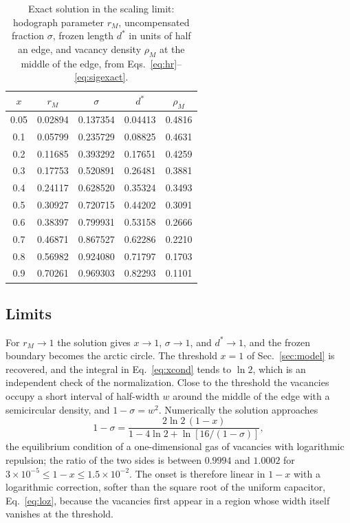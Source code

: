 \documentclass[reprint,aps,pre,superscriptaddress,longbibliography,floatfix,amsmath,amssymb]{revtex4-2}
\newcommand{\sig}{\sigma}                %
\newcommand{\dst}{d^{*}}                 %
\newcommand{\rM}{r_{M}}
\begin{document}
\begin{table}[b]
\caption{Exact solution in the scaling limit: hodograph parameter $\rM$, uncompensated fraction $\sig$, frozen length $\dst$ in units of half an edge, and vacancy density $\rho_M$ at the middle of the edge, from Eqs.~\eqref{eq:hr}--\eqref{eq:sigexact}.}
\label{tab:sol}
\begin{ruledtabular}
\begin{tabular}{ccccc}
$x$ & $\rM$ & $\sig$ & $\dst$ & $\rho_M$\\ \hline
0.05 & 0.02894 & 0.137354 & 0.04413 & 0.4816\\
0.1 & 0.05799 & 0.235729 & 0.08825 & 0.4631\\
0.2 & 0.11685 & 0.393292 & 0.17651 & 0.4259\\
0.3 & 0.17753 & 0.520891 & 0.26481 & 0.3881\\
0.4 & 0.24117 & 0.628520 & 0.35324 & 0.3493\\
0.5 & 0.30927 & 0.720715 & 0.44202 & 0.3091\\
0.6 & 0.38397 & 0.799931 & 0.53158 & 0.2666\\
0.7 & 0.46871 & 0.867527 & 0.62286 & 0.2210\\
0.8 & 0.56982 & 0.924080 & 0.71797 & 0.1703\\
0.9 & 0.70261 & 0.969303 & 0.82293 & 0.1101\\
\end{tabular}
\end{ruledtabular}
\end{table}

\subsection{Limits}

For $\rM\to1$ the solution gives $x\to1$, $\sig\to1$, and $\dst\to1$, and the frozen boundary becomes the arctic circle. The threshold $x=1$ of Sec.~\ref{sec:model} is recovered, and the integral in Eq.~\eqref{eq:xcond} tends to $\ln2$, which is an independent check of the normalization. Close to the threshold the vacancies occupy a short interval of half-width $w$ around the middle of the edge with a semicircular density, and $1-\sig=w^2$. Numerically the solution approaches
\begin{equation}\label{eq:near1}
  1-\sig=\frac{2\ln2\,(1-x)}{1-4\ln2+\ln[16/(1-\sig)]},
\end{equation}
the equilibrium condition of a one-dimensional gas of vacancies with logarithmic repulsion; the ratio of the two sides is between $0.9994$ and $1.0002$ for $3\times10^{-5}\le1-x\le1.5\times10^{-2}$. The onset is therefore linear in $1-x$ with a logarithmic correction, softer than the square root of the uniform capacitor, Eq.~\eqref{eq:loz}, because the vacancies first appear in a region whose width itself vanishes at the threshold.
\end{document}
